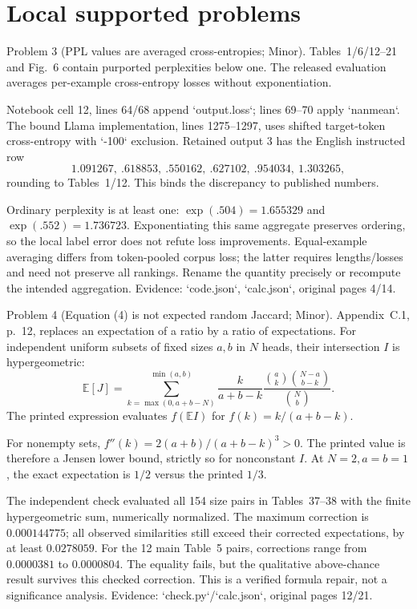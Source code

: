 \documentclass[10pt]{article}
\begin{document}
\section*{Local supported problems}
Problem 3 (PPL values are averaged cross-entropies; Minor).  Tables 1/6/12–21 and Fig. 6 contain purported perplexities below one. The released evaluation averages per-example cross-entropy losses without exponentiation.\par
Notebook cell 12, lines 64/68 append `output.loss`; lines 69–70 apply `nanmean`. The bound Llama implementation, lines 1275–1297, uses shifted target-token cross-entropy with `-100` exclusion. Retained output 3 has the English instructed row \[1.091267,\ .618853,\ .550162,\ .627102,\ .954034,\ 1.303265,\] rounding to Tables 1/12. This binds the discrepancy to published numbers.\par
Ordinary perplexity is at least one: \(\exp(.504)=1.655329\) and \(\exp(.552)=1.736723\). Exponentiating this same aggregate preserves ordering, so the local label error does not refute loss improvements. Equal-example averaging differs from token-pooled corpus loss; the latter requires lengths/losses and need not preserve all rankings. Rename the quantity precisely or recompute the intended aggregation. Evidence: `code.json`, `calc.json`, original pages 4/14.\par
Problem 4 (Equation (4) is not expected random Jaccard; Minor).  Appendix C.1, p. 12, replaces an expectation of a ratio by a ratio of expectations. For independent uniform subsets of fixed sizes \(a,b\) in \(N\) heads, their intersection \(I\) is hypergeometric: \[\mathbb E[J]=
 \sum_{k=\max(0,a+b-N)}^{\min(a,b)}
 \frac{k}{a+b-k}
 \frac{\binom ak\binom{N-a}{b-k}}{\binom Nb}.\] The printed expression evaluates \(f(\mathbb E I)\) for \(f(k)=k/(a+b-k)\).\par
For nonempty sets, \(f''(k)=2(a+b)/(a+b-k)^3>0\). The printed value is therefore a Jensen lower bound, strictly so for nonconstant \(I\). At \(N=2,a=b=1\), the exact expectation is \(1/2\) versus the printed \(1/3\).\par
The independent check evaluated all 154 size pairs in Tables 37–38 with the finite hypergeometric sum, numerically normalized. The maximum correction is \(0.000144775\); all observed similarities still exceed their corrected expectations, by at least \(0.0278059\). For the 12 main Table 5 pairs, corrections range from \(0.0000381\) to \(0.0000804\). The equality fails, but the qualitative above-chance result survives this checked correction. This is a verified formula repair, not a significance analysis. Evidence: `check.py`/`calc.json`, original pages 12/21.\par
\end{document}
